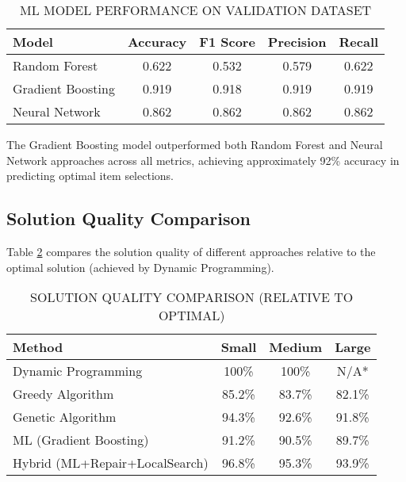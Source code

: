 \documentclass[conference, a4paper]{IEEEtran}
\begin{document}
\begin{table}[htbp]
\caption{ML MODEL PERFORMANCE ON VALIDATION DATASET}
\begin{center}
\begin{tabular}{|l|c|c|c|c|}
\hline
\textbf{Model} & \textbf{Accuracy} & \textbf{F1 Score} & \textbf{Precision} & \textbf{Recall} \\
\hline
Random Forest & 0.622 & 0.532 & 0.579 & 0.622 \\
\hline
Gradient Boosting & 0.919 & 0.918 & 0.919 & 0.919 \\
\hline
Neural Network & 0.862 & 0.862 & 0.862 & 0.862 \\
\hline
\end{tabular}
\label{tab:ml_performance}
\end{center}
\end{table}

The Gradient Boosting model outperformed both Random Forest and Neural Network approaches across all metrics, achieving approximately 92\% accuracy in predicting optimal item selections.

\subsection{Solution Quality Comparison}
Table \ref{tab:solution_quality} compares the solution quality of different approaches relative to the optimal solution (achieved by Dynamic Programming).

\begin{table}[htbp]
\caption{SOLUTION QUALITY COMPARISON (RELATIVE TO OPTIMAL)}
\begin{center}
\begin{tabular}{|l|c|c|c|}
\hline
\textbf{Method} & \textbf{Small} & \textbf{Medium} & \textbf{Large} \\
\hline
Dynamic Programming & 100\% & 100\% & N/A* \\
\hline
Greedy Algorithm & 85.2\% & 83.7\% & 82.1\% \\
\hline
Genetic Algorithm & 94.3\% & 92.6\% & 91.8\% \\
\hline
ML (Gradient Boosting) & 91.2\% & 90.5\% & 89.7\% \\
\hline
Hybrid (ML+Repair+LocalSearch) & 96.8\% & 95.3\% & 93.9\% \\
\hline
\end{tabular}
\end{center}
\label{tab:solution_quality}
\end{table}
\end{document}
